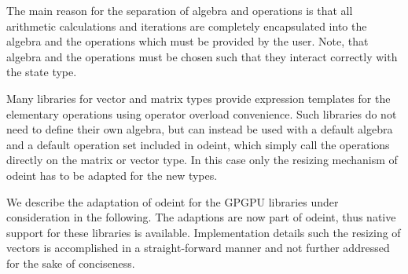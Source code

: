 \documentclass[final]{siamltex}
\newcommand{\code}[1]{\lstinline|#1|}
\begin{document}
The main reason for the separation of algebra and operations is that
all arithmetic calculations and iterations are completely encapsulated
into the algebra and the operations which must be provided by the
user. Note, that algebra and the operations must be chosen such that
they interact correctly with the state type.








Many libraries for vector and matrix types provide expression
templates \cite{Veldhuizen:ExpressionTemplates, Veldhuizen:Techniques,
Vandevoorde:CppTemplates} for the elementary operations using operator overload
convenience.
Such libraries do not need to define their own algebra,
but can instead be used with a default algebra
and a default operation set included in odeint,
which simply call the operations directly on the matrix or vector type.
In this case only the resizing mechanism of odeint has to be adapted for the new types.

We describe the adaptation of odeint for the GPGPU libraries under consideration
in the following. The adaptions are now part of odeint, thus native support
for these libraries is available.
Implementation details such the resizing of vectors is accomplished in a straight-forward manner
and not further addressed for the sake of conciseness.
\end{document}
